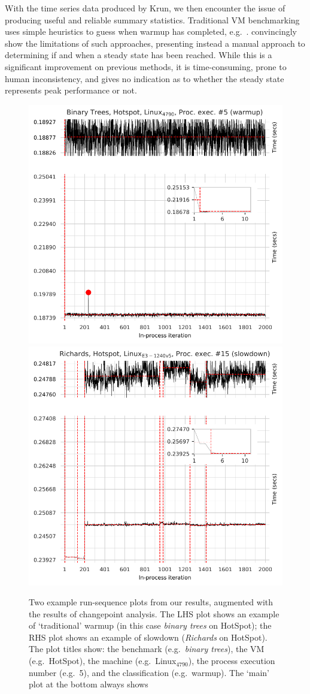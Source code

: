 \documentclass[acmsmall,screen]{acmart}
\newcommand{\krun}{Krun\xspace}
\newcommand{\binarytrees}{\emph{binary trees}\xspace}
\newcommand{\richards}{\emph{Richards}\xspace}
\newcommand{\bencherfive}{Linux$_\mathrm{4790}$\xspace}
\begin{document}
With the time series data produced by \krun, we then encounter the issue of
producing useful and reliable summary statistics. Traditional VM benchmarking
uses simple heuristics to guess when warmup has completed,
e.g.~\citet{georges07statistically}. \citet{kalibera13rigorous} convincingly show the limitations of such approaches,
presenting instead a manual approach to determining
if and when a steady state has been reached. While this is a significant improvement on
previous methods, it is time-consuming, prone to human inconsistency, and gives no
indication as to whether the steady state represents peak performance or not.

\begin{figure}[t]
\centering
\includegraphics[width=.49\textwidth]{examples/new_warmup_no_migrate.pdf}
\hspace{\fill}
\includegraphics[width=.49\textwidth]{examples/changepoint_example.pdf}
\caption{Two example run-sequence plots from our results, augmented
with the results of changepoint analysis. The LHS plot
shows an example of `traditional' warmup (in this case \binarytrees on HotSpot);
the RHS plot shows an example of slowdown (\richards on HotSpot). The
plot titles show: the benchmark (e.g.~\binarytrees), the VM (e.g.~HotSpot),
the machine (e.g.~\bencherfive), the process execution number (e.g.~5),
and the classification (e.g.~warmup). The `main' plot at the bottom always shows
}
\end{figure}
\end{document}
